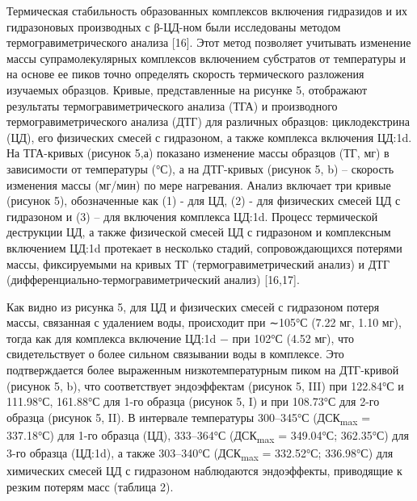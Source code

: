 
Термическая стабильность образованных комплексов включения гидразидов и
их гидразоновых производных с β-ЦД-ном были исследованы методом
термогравиметрического анализа {[}16{]}. Этот метод позволяет учитывать
изменение массы супрамолекулярных комплексов включением субстратов от
температуры и на основе ее пиков точно определять скорость термического
разложения изучаемых образцов. Кривые, представленные на рисунке 5,
отображают результаты термогравиметрического анализа (ТГА) и
производного термогравиметрического анализа (ДТГ) для различных
образцов: циклодекстрина (ЦД), его физических смесей с гидразоном, а
также комплекса включения ЦД:1d. На ТГА-кривых (рисунок 5,а) показано
изменение массы образцов (ТГ, мг) в зависимости от температуры (°С), а
на ДТГ-кривых (рисунок 5, b) -- скорость изменения массы (мг/мин) по
мере нагревания. Анализ включает три кривые (рисунок 5), обозначенные
как (1) - для ЦД, (2) - для физических смесей ЦД с гидразоном и (3) --
для включения комплекса ЦД:1d. Процесс термической деструкции ЦД, а
также физической смесей ЦД с гидразоном и комплексным включением ЦД:1d
протекает в несколько стадий, сопровождающихся потерями массы,
фиксируемыми на кривых ТГ (термогравиметрический анализ) и ДТГ
(дифференциально-термогравиметрический анализ) {[}16,17{]}.

Как видно из рисунка 5, для ЦД и физических смесей с гидразоном потеря
массы, связанная с удалением воды, происходит при ∼105°С (7.22 мг, 1.10
мг), тогда как для комплекса включение ЦД:1d − при 102°С (4.52 мг), что
свидетельствует о более сильном связывании воды в комплексе. Это
подтверждается более выраженным низкотемпературным пиком на ДТГ-кривой
(рисунок 5, b), что соответствует эндоэффектам (рисунок 5, III) при
122.84°С и 111.98°С, 161.88°С для 1-го образца (рисунок 5, I) и при
108.73°С для 2-го образца (рисунок 5, II). В интервале температуры
300--345°С (ДСК\textsubscript{max} = 337.18°С) для 1-го образца (ЦД),
333--364°С (ДСК\textsubscript{max} = 349.04°С; 362.35°С) для 3-го
образца (ЦД:1d), а также 303--340°С (ДСК\textsubscript{max} = 332.52°С;
336.98°С) для химических смесей ЦД с гидразоном наблюдаются эндоэффекты,
приводящие к резким потерям масс (таблица 2).

